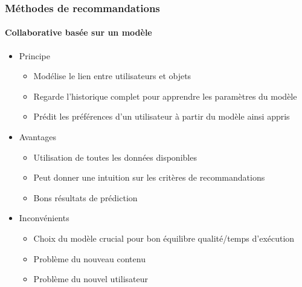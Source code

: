 \documentclass[a4,11pt,sans]{beamer}
\begin{document}
    \begin{frame}
        \frametitle{M\'ethodes de recommandations}
        \framesubtitle{Collaborative bas\'ee sur un modèle}

        \begin{itemize}
            \item Principe
                \begin{itemize}
                    \item Mod\'elise le lien entre utilisateurs et objets
                    \item Regarde l'historique complet pour apprendre les
                        paramètres du modèle
                    \item Pr\'edit les pr\'ef\'erences d'un utilisateur à
                        partir du modèle ainsi appris
                \end{itemize}
            \item Avantages
                \begin{itemize}
                    \item Utilisation de toutes les donn\'ees disponibles
                    \item Peut donner une intuition sur les critères de
                        recommandations
                    \item Bons r\'esultats de pr\'ediction
                \end{itemize}
            \item Inconv\'enients
                \begin{itemize}
                    \item Choix du modèle crucial pour bon \'equilibre
                        qualit\'e/temps d'ex\'ecution
                    \item Problème du nouveau contenu
                    \item Problème du nouvel utilisateur
                \end{itemize}
        \end{itemize}
    \end{frame}

\end{document}
